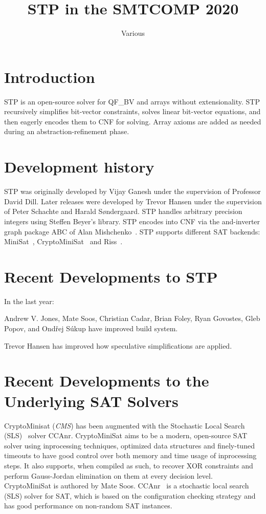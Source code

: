 \documentclass{easychair}
\begin{document}
\title{STP in the SMTCOMP 2020}
\author{Various}
\institute{}

\maketitle
\thispagestyle{empty}
\pagestyle{empty}

\section{Introduction}
STP\cite{Vijay:Thesis:2007} is an open-source solver for QF\_BV and arrays without extensionality. 
STP recursively simplifies bit-vector constraints, solves linear bit-vector equations, and then eagerly encodes them to CNF for solving. 
Array axioms are added as needed during an abstraction-refinement phase.

\section{Development history}
STP was originally developed by Vijay Ganesh under the supervision of Professor David Dill. 
Later releases were developed by Trevor Hansen under the supervision of Peter Schachte and Harald Søndergaard. 
STP handles arbitrary precision integers using Steffen Beyer's library. 
STP encodes into CNF via the and-inverter graph package ABC of Alan Mishchenko~\cite{Brayton:2010:AAI:2144310.2144317}.
STP supports different SAT backends: MiniSat~\cite{MiniSat:github}, CryptoMiniSat~\cite{CMS:github} and Riss~\cite{Riss:github}.

\section{Recent Developments to STP}
In the last year:

Andrew V. Jones, Mate Soos, Christian Cadar, Brian Foley, Ryan Govostes, Gleb Popov, and Ondřej Súkup have improved build system. 

Trevor Hansen has improved how speculative simplifications are applied.


\section{Recent Developments to the Underlying SAT Solvers}
CryptoMinisat (\emph{CMS}) has been augmented with the Stochastic Local Search (SLS)~\cite{DBLP:conf/sat/CaiLS15} solver CCAnr. 
CryptoMiniSat aims to be a modern, open-source SAT solver using inprocessing techniques, optimized data structures and finely-tuned timeouts to have good control over both memory and time usage of inprocessing steps. It also supports, when compiled as such, to recover XOR constraints and perform Gauss-Jordan elimination on them at every decision level. CryptoMiniSat is authored by Mate Soos. CCAnr~\cite{DBLP:conf/sat/CaiLS15} is a stochastic local search (SLS) solver for SAT, which is based on the configuration checking strategy and has good performance on non-random SAT instances. 
\end{document}
